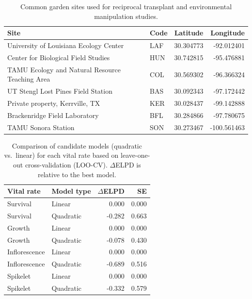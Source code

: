 \documentclass[12pt]{article}\usepackage[]{graphicx}\usepackage[dvipsnames]{xcolor}
\begin{document}
{\begin{table}[ht]
\caption{Common garden sites used for reciprocal transplant and environmental manipulation studies.}
\label{tab:exp_sites}
\begin{tabular}{llrr}
\hline
Site & Code & Latitude & Longitude \\
\hline
University of Louisiana Ecology Center           & LAF & 30.304773 & -92.012401 \\
Center for Biological Field Studies              & HUN & 30.742815 & -95.476881 \\
TAMU Ecology and Natural Resource Teaching Area  & COL & 30.569302 & -96.366324 \\
UT Stengl Lost Pines Field Station               & BAS & 30.092343 & -97.172442 \\
Private property, Kerrville, TX                  & KER & 30.028437 & -99.142888 \\
Brackenridge Field Laboratory                    & BFL & 30.284866 & -97.780675 \\
TAMU Sonora Station                              & SON & 30.273467 & -100.561463 \\
\hline
\end{tabular}
\end{table}
\clearpage


\begin{table}[ht]
 \caption{Sample sizes for each combination of seed source population, soil-origin site, and endophyte treatment in the greenhouse experiment.
The experiment crossed two seed source populations (LPEF and SJC), seven soil-origin sites along the precipitation gradient, and two symbiont treatments ($S^{-}$ and $S^{+}$). Most treatment combinations included seven replicates, except LPEF $\times$ BFL $\times$ $S^{-}$ where $n = 6$ due to early mortality.}   
    \centering
    \small
    
    \label{tab:soil_pop}
\end{table}
\clearpage


\begin{table}[ht]
\centering
\caption{Comparison of candidate models (quadratic vs.\ linear) for each vital rate based on leave-one-out cross-validation (LOO-CV).
$\Delta$ELPD is relative to the best model.}
\label{tab:model_comparison}
\begin{tabular}{llrr}
\hline
Vital rate & Model type & $\Delta$ELPD & SE \\
\hline
Survival      & Linear    & 0.000  & 0.000 \\
Survival      & Quadratic & -0.282 & 0.663 \\
Growth        & Linear    & 0.000  & 0.000 \\
Growth        & Quadratic & -0.078 & 0.430 \\
Inflorescence & Linear    & 0.000  & 0.000 \\
Inflorescence & Quadratic & -0.689 & 0.516 \\
Spikelet      & Linear    & 0.000  & 0.000 \\
Spikelet      & Quadratic & -0.332 & 0.579 \\
\hline
\end{tabular}
\end{table}
\clearpage

}
\end{document}
